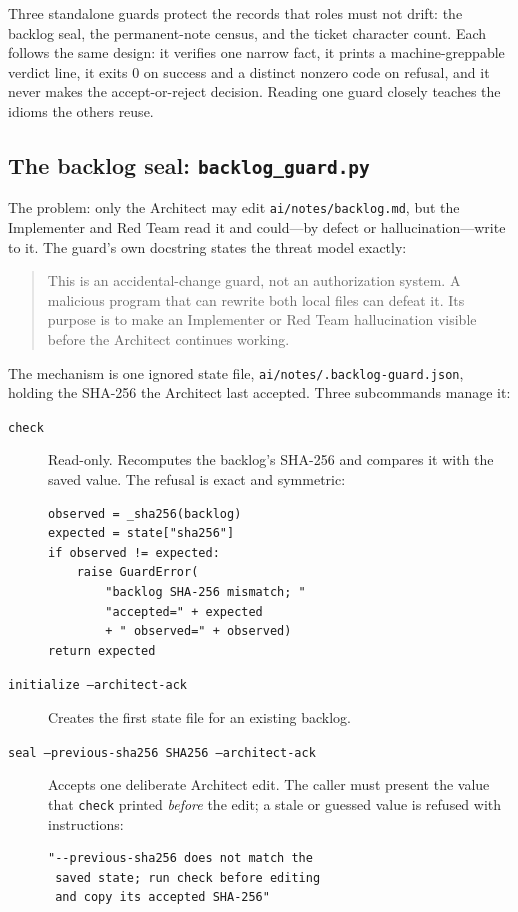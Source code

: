 \documentclass[10pt,aps,prd,twocolumn,nofootinbib]{revtex4-2}
\newcommand{\code}[1]{\texttt{#1}}
\newcommand{\file}[1]{\texttt{#1}}
\begin{document}
Three standalone guards protect the records that roles must not drift:
the backlog seal, the permanent-note census, and the ticket character
count.  Each follows the same design: it verifies one narrow fact, it
prints a machine-greppable verdict line, it exits 0 on success and a
distinct nonzero code on refusal, and it never makes the accept-or-reject
decision.  Reading one guard closely teaches the idioms the others
reuse.

\subsection{The backlog seal: \file{backlog\_guard.py}}
\label{sec:backlog-guard}

The problem: only the Architect may edit \file{ai/notes/backlog.md},
but the Implementer and Red Team read it and could---by defect or
hallucination---write to it.  The guard's own docstring states the
threat model exactly:

\begin{quote}\small
This is an accidental-change guard, not an authorization system.  A
malicious program that can rewrite both local files can defeat it.  Its
purpose is to make an Implementer or Red Team hallucination visible
before the Architect continues working.
\end{quote}

The mechanism is one ignored state file,
\file{ai/notes/.backlog-guard.json}, holding the SHA-256 the Architect
last accepted.  Three subcommands manage it:

\begin{description}
  \item[\code{check}]  Read-only.  Recomputes the backlog's SHA-256 and
  compares it with the saved value.  The refusal is exact and
  symmetric:
\begin{verbatim}
observed = _sha256(backlog)
expected = state["sha256"]
if observed != expected:
    raise GuardError(
        "backlog SHA-256 mismatch; "
        "accepted=" + expected
        + " observed=" + observed)
return expected
\end{verbatim}

  \item[\code{initialize --architect-ack}]  Creates the first state
  file for an existing backlog.

  \item[\code{seal --previous-sha256 SHA256 --architect-ack}]  Accepts
  one deliberate Architect edit.  The caller must present the value
  that \code{check} printed \emph{before} the edit; a stale or guessed
  value is refused with instructions:
\begin{verbatim}
"--previous-sha256 does not match the
 saved state; run check before editing
 and copy its accepted SHA-256"
\end{verbatim}
\end{description}
\end{document}
